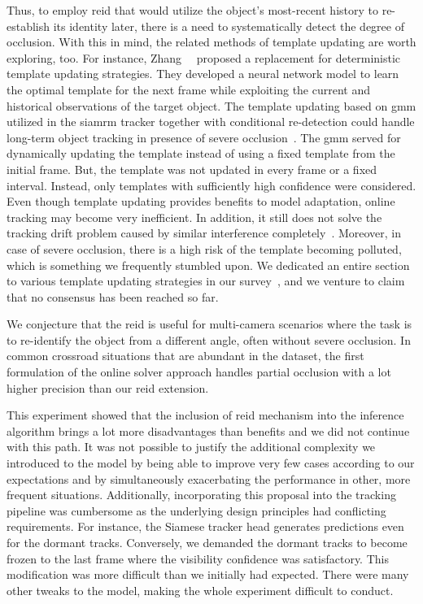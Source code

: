 Thus, to employ \gls{reid} that would utilize the object's most-recent history to re-establish its identity later, there is a need to systematically detect the degree of occlusion. With this in mind, the related methods of template updating are worth exploring, too. For instance, Zhang~\etal{}~\cite{zhang2019learning} proposed a replacement for deterministic template updating strategies. They developed a neural network model to learn the optimal template for the next frame while exploiting the current and historical observations of the target object. The template updating based on \gls{gmm} utilized in the \gls{siamrm} tracker together with conditional re-detection could handle long-term object tracking in presence of severe occlusion~\cite{li2019siamrm}. The \gls{gmm} served for dynamically updating the template instead of using a fixed template from the initial frame. But, the template was not updated in every frame or a fixed interval. Instead, only templates with sufficiently high confidence were considered. Even though template updating provides benefits to model adaptation, online tracking may become very inefficient. In addition, it still does not solve the tracking drift problem caused by similar interference completely~\cite{guo2019siamcar}. Moreover, in case of severe occlusion, there is a high risk of the template becoming polluted, which is something we frequently stumbled upon. We dedicated an entire section to various template updating strategies in our survey~\cite{ondrasovic2021siamese}, and we venture to claim that no consensus has been reached so far.

We conjecture that the \gls{reid} is useful for multi-camera scenarios where the task is to re-identify the object from a different angle, often without severe occlusion. In common crossroad situations that are abundant in the \uadetrac{} dataset, the first formulation of the online solver approach handles partial occlusion with a lot higher precision than our \gls{reid} extension.

This experiment showed that the inclusion of \gls{reid} mechanism into the inference algorithm brings a lot more disadvantages than benefits and we did not continue with this path. It was not possible to justify the additional complexity we introduced to the model by being able to improve very few cases according to our expectations and by simultaneously exacerbating the performance in other, more frequent situations. Additionally, incorporating this proposal into the tracking pipeline was cumbersome as the underlying design principles had conflicting requirements. For instance, the Siamese tracker head generates predictions even for the dormant tracks. Conversely, we demanded the dormant tracks to become frozen to the last frame where the visibility confidence was satisfactory. This modification was more difficult than we initially had expected. There were many other tweaks to the model, making the whole experiment difficult to conduct.

